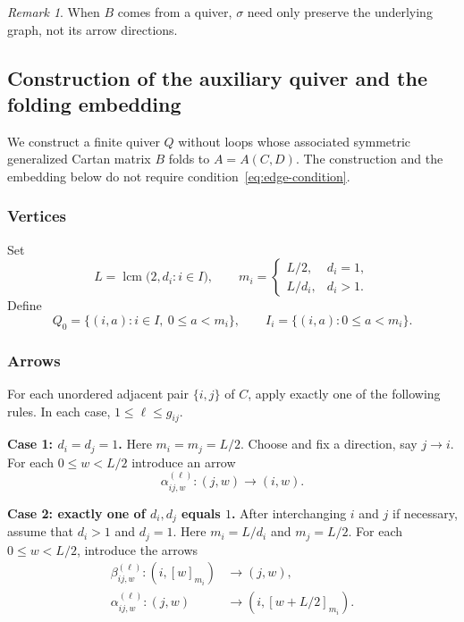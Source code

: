 \documentclass[12pt,reqno]{amsart}
\numberwithin{equation}{section}
\theoremstyle{definition}
\theoremstyle{remark}
\newtheorem{remark}[theorem]{Remark}
\newcommand{\lcm}{\operatorname{lcm}}
\theoremstyle{plain}
\theoremstyle{plain}
\begin{document}
\begin{remark}
When $B$ comes from a quiver, $\sigma$ need only preserve the underlying graph, not its arrow directions.
\end{remark}




\subsection{Construction of the auxiliary quiver and the folding embedding}\label{subsec:auxiliary-quiver}
  We construct a finite quiver $Q$ without loops whose associated symmetric generalized Cartan matrix $B$ folds to $A=A(C,D)$. The construction and the embedding below do not require condition~\eqref{eq:edge-condition}.

\subsubsection{Vertices}
Set
\begin{equation}\label{eq:inj-weightsizes}
  L=\lcm\bigl(2,d_i:i\in I\bigr), \qquad
  m_i=
\begin{cases}
  L/2,& d_i=1,\\
  L/d_i,& d_i>1.
\end{cases}
\end{equation}
  Define
\[
    Q_0=\{(i,a):i\in I,\ 0\le a<m_i\},
    \qquad
    I_i=\{(i,a):0\le a<m_i\}.
\]

\subsubsection{Arrows}
For each unordered adjacent pair $\{i,j\}$ of $C$, apply exactly one of the following rules. In each case, $1\le\ell\le g_{ij}$.

\par\smallskip
\noindent\textbf{Case 1: $d_i=d_j=1$.}
Here $m_i=m_j=L/2$. Choose and fix a direction, say $j\to i$. For each $0\leq w<L/2$
introduce an arrow
\[
\alpha_{ij,w}^{(\ell)}:
(j,w)\longrightarrow(i,w).
\]

\par\smallskip
\noindent\textbf{Case 2: exactly one of $d_i,d_j$ equals $1$.}
After interchanging $i$ and $j$ if necessary, assume that $d_i>1$ and $d_j=1$. Here $m_i=L/d_i$ and $m_j=L/2$. For each $0\le w<L/2$, introduce the arrows
\begin{equation}\label{eq:inj-mixed-arrows}
\begin{aligned}
\beta_{ij,w}^{(\ell)}:
(i,[w]_{m_i})&\longrightarrow(j,w),\\
\alpha_{ij,w}^{(\ell)}:
(j,w)&\longrightarrow(i,[w+L/2]_{m_i}).
\end{aligned}
\end{equation}
\end{document}
